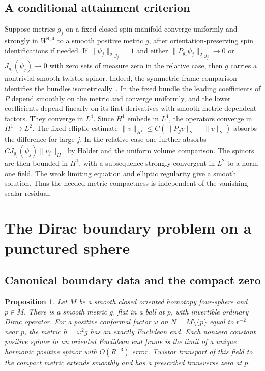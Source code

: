 \documentclass[11pt]{article}
\numberwithin{equation}{section}
\newtheorem{proposition}[theorem]{Proposition}
\newcommand{\norm}[1]{\lVert #1\rVert}
\begin{document}
\subsection{A conditional attainment criterion}

Suppose metrics \(g_j\) on a fixed closed spin manifold converge
uniformly and strongly in \(W^{1,4}\) to a smooth positive metric
\(g\), after orientation-preserving spin identifications if needed.
If \(\norm{\psi_j}_{2,g_j}=1\) and either
\(\norm{P_{g_j}\psi_j}_{2,g_j}\to0\) or \(J_{g_j}(\psi_j)\to0\)
with zero sets of measure zero in the relative case, then \(g\)
carries a nontrivial smooth twistor spinor.
Indeed, the symmetric frame comparison identifies the bundles
isometrically~\cite{BourguignonGauduchon1992}. In the fixed bundle
the leading coefficients of \(P\) depend smoothly on the metric and
converge uniformly, and the lower coefficients depend linearly on
its first derivatives with smooth metric-dependent factors.
They converge in \(L^4\). Since \(H^1\) embeds in \(L^4\),
the operators converge in \(H^1\to L^2\). The fixed elliptic estimate
\(\norm{v}_{H^1}\le C(\norm{P_g v}_2+\norm v_2)\) absorbs the difference
for large \(j\). In the relative case one further absorbs
\(C J_{g_j}(\psi_j)\norm{v_j}_{H^1}\) by H\"older and the uniform volume
comparison. The spinors are then bounded in \(H^1\), with a
subsequence strongly convergent in \(L^2\) to a norm-one field.
The weak limiting equation and elliptic regularity give a smooth
solution. Thus the needed metric compactness is independent of the
vanishing scalar residual.

\section{The Dirac boundary problem on a punctured sphere}\label{sec:green}

\subsection{Canonical boundary data and the compact zero}

\begin{proposition}\label{prop:green}
Let \(M\) be a smooth closed oriented homotopy four-sphere and \(p\in M\).
There is a smooth metric \(g\), flat in a ball at \(p\), with invertible
ordinary Dirac operator. For a positive conformal factor \(\omega\) on
\(N=M\setminus\{p\}\) equal to \(r^{-2}\) near \(p\), the metric
\(h=\omega^2g\) has an exactly Euclidean end. Each nonzero constant
positive spinor in an oriented Euclidean end frame is the limit of a
unique harmonic positive spinor with \(O(R^{-3})\) error. Twistor
transport of this field to the compact metric extends smoothly and
has a prescribed transverse zero at \(p\).
\end{proposition}
\end{document}
